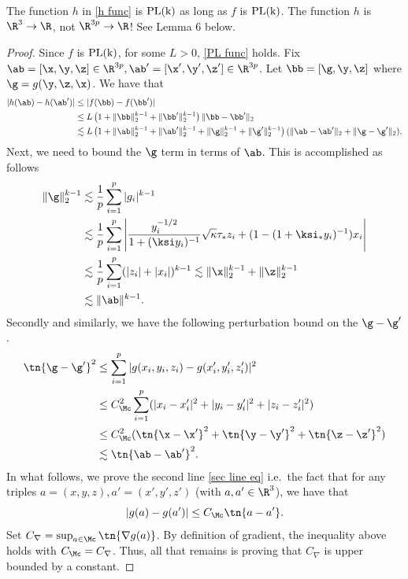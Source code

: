 \begin{lemma} The function $h$ in \eqref{h func} is $\rm{PL}(k)$ as long as $f$ is $\rm{PL}(k)$.
{\color{red}The function $h$ is $\R^3\rightarrow\R$, not $\R^{3p}\rightarrow\R$! See Lemma 6 below.}
\end{lemma}
\begin{proof} 
Since $f$ is $\rm{PL}(k)$, for some $L>0$, \eqref{PL func} holds. Fix $\ab=[\x,\y,\z]\in\R^{3p},\ab'=[\x',\y',\z']\in\R^{3p}$. Let $\bb=[\g,\y,\z]$ where $\g=g(\y,\z,\x)$. We have that
\begin{align}
|h(\ab)-h(\ab')|&\leq |f(\bb)-f(\bb')|\\
&\leq L\left(1+\|\bb\|_2^{k-1}+\|\bb'\|_2^{k-1}\right)\|\bb-\bb'\|_2\\
&\lesssim L\left(1+\|\ab\|_2^{k-1}+\|\ab'\|_2^{k-1}+\|\g\|_2^{k-1}+\|\g'\|_2^{k-1}\right)(\|\ab-\ab'\|_2+\|\g-\g'\|_2).
\end{align}
Next, we need to bound the $\g$ term in terms of $\ab$. This is accomplished as follows
\begin{align}
\|\g\|_2^{k-1}&\lesssim \frac{1}{p}\sum_{i=1}^p|g_i|^{k-1}\\
&\lesssim \frac{1}{p}\sum_{i=1}^p\left|\frac{y_i^{-1/2}}{1+(\ksi y_i)^{-1}}\sqrt{\kappa}\tau_* z_i + (1-(1+\ksi_*y_i)^{-1})x_i\right|\\
&\lesssim \frac{1}{p}\sum_{i=1}^p(|z_i|+|x_i|)^{k-1}\lesssim \|\x\|_2^{k-1}+\|\z\|_2^{k-1}\\
&\lesssim \|\ab\|^{k-1}.
\end{align}
Secondly and similarly, we have the following perturbation bound on the $\g-\g'$.  
\begin{align}
\tn{\g-\g'}^2&\leq \sum_{i=1}^p|g(x_i,y_i,z_i)-g(x'_i,y'_i,z'_i)|^2\\
&\leq C^2_{\Mc} \sum_{i=1}^p(|x_i-x'_i|^2+|y_i-y'_i|^2+|z_i-z'_i|^2)\label{sec line eq}\\
&\leq C^2_{\Mc} (\tn{\x-\x'}^2+\tn{\y-\y'}^2+\tn{\z-\z'}^2)\\
&\lesssim \tn{\ab-\ab'}^2.
\end{align}
In what follows, we prove the second line \eqref{sec line eq} i.e.~the fact that for any triples $a=(x,y,z),a'=(x',y',z')$ (with $a,a'\in\R^3$), we have that 
\[
|g(a)-g(a')|\leq C_{\Mc}\tn{a-a'}.
\]
Set $C_\nabla=\sup_{a\in \Mc}\tn{\nabla g(a)}$. By definition of gradient, the inequality above holds with $C_\Mc=C_\nabla$. Thus, all that remains is proving that $C_\nabla$ is upper bounded by a constant. 
\end{proof}



